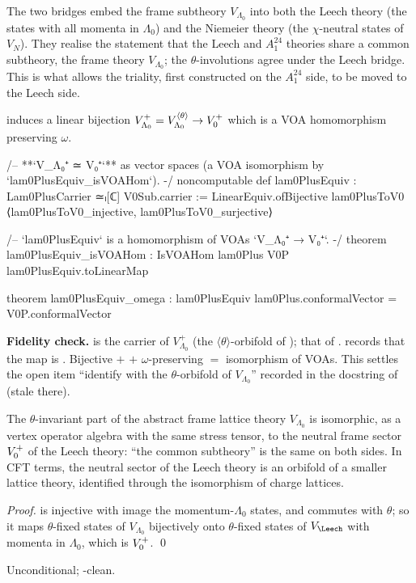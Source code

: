 \begin{physics}
The two bridges embed the frame subtheory $V_{\Lambda_0}$ into both the Leech theory (the states with all momenta in $\Lambda_0$) and the Niemeier theory (the $\chi$-neutral states of $V_N$). They realise the statement that the Leech and $A_1^{24}$ theories share a common subtheory, the frame theory $V_{\Lambda_0}$; the $\theta$-involutions agree under the Leech bridge. This is what allows the triality, first constructed on the $A_1^{24}$ side, to be moved to the Leech side.
\end{physics}

\begin{theorem}\label{ch11:thm:lam0plus}
 induces a linear bijection $V_{\Lambda_0}^+=V_{\Lambda_0}^{\langle\theta\rangle}\to V_0^{+}$
which is a VOA homomorphism preserving $\omega$.
\end{theorem}
\begin{leancode}
/-- **`V_{Λ₀}⁺ ≃ V₀⁺`** as vector spaces (a VOA isomorphism by `lam0PlusEquiv_isVOAHom`). -/
noncomputable def lam0PlusEquiv : Lam0PlusCarrier ≃ₗ[ℂ] V0Sub.carrier :=
  LinearEquiv.ofBijective lam0PlusToV0 ⟨lam0PlusToV0_injective, lam0PlusToV0_surjective⟩

/-- `lam0PlusEquiv` is a homomorphism of VOAs `V_{Λ₀}⁺ → V₀⁺`. -/
theorem lam0PlusEquiv_isVOAHom : IsVOAHom lam0Plus V0P lam0PlusEquiv.toLinearMap

theorem lam0PlusEquiv_omega : lam0PlusEquiv lam0Plus.conformalVector = V0P.conformalVector
\end{leancode}
\begin{dictionary}
\textbf{Fidelity check.}   is the carrier of $V_{\Lambda_0}^+$
(the $\langle\theta\rangle$-orbifold  of );  that of
.   records that the map is .  Bijective $+$
 $+$ $\omega$-preserving $=$ isomorphism of VOAs.  This settles the open item
``identify  with the $\theta$-orbifold of $V_{\Lambda_0}$'' recorded in the docstring of
 (stale there).
\end{dictionary}

\begin{physics}
The $\theta$-invariant part of the abstract frame lattice theory $V_{\Lambda_0}$ is isomorphic, as a vertex operator algebra with the same stress tensor, to the neutral frame sector $V_0^{+}$ of the Leech theory: ``the common subtheory'' is the same on both sides. In CFT terms, the neutral sector of the Leech theory is an orbifold of a smaller lattice theory, identified through the isomorphism of charge lattices.
\end{physics}
\emph{Proof.}   is injective with image the momentum-$\Lambda_0$ states, and commutes with
$\theta$; so it maps $\theta$-fixed states of $V_{\Lambda_0}$ bijectively onto $\theta$-fixed states of
$V_\Leech$ with momenta in $\Lambda_0$, which is $V_0^{+}$. \qed
\begin{status}Unconditional; -clean.\end{status}

